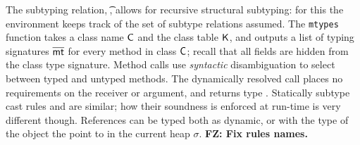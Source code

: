 \documentclass[acmlarge, anonymous, authordraft]{acmart}
\newcommand{\FZ}[1]{\textbf{FZ: #1}}
\begin{document}
The
subtyping relation, \StrSub\M\K\t\tp, allows for recursive structural
subtyping: for this the environment \M keeps track of the set of subtype relations assumed.  The \texttt{mtypes} function takes a class name ${\sf{C}}$ and the class table
${\sf{K}}$, and outputs a list of typing signatures $\overline{{\sf{mt}}}$ for every method in
class ${\sf{C}}$; recall that all fields are hidden from the class type signature. 
Method calls use \emph{syntactic} disambiguation to select between
typed and untyped methods. The dynamically resolved call places no
requirements on the receiver or argument, and returns type \any. 
Statically subtype cast rules  and  are similar; how their soundness is enforced at run-time is very different though.  References can be typed both as dynamic, or with the type of the object the point to in the current heap \(\sigma\).   \FZ{Fix rules names.}
\end{document}
